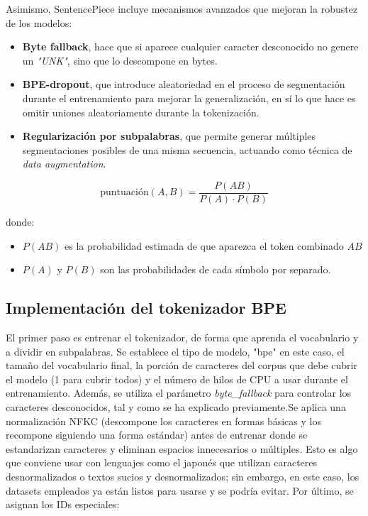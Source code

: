 \documentclass[11pt]{book}
\begin{document}
Asimismo, SentencePiece incluye mecanismos avanzados que mejoran la robustez de los modelos: 
\begin{itemize}
    \item \textbf{Byte fallback}, hace que si aparece cualquier caracter desconocido no genere un \textit{"UNK"}, sino que lo descompone en bytes.
    \item \textbf{BPE-dropout}, que introduce aleatoriedad en el proceso de segmentación durante el entrenamiento para mejorar la generalización, en sí lo que hace es omitir uniones aleatoriamente durante la tokenización.
    \item \textbf{Regularización por subpalabras}, que permite generar múltiples segmentaciones posibles de una misma secuencia, actuando como técnica de \textit{data augmentation}.
\end{itemize}


\[
\text{puntuación}(A,B) = \frac{P(AB)}{P(A) \cdot P(B)}
\]

donde:
\begin{itemize}
    \item $P(AB)$ es la probabilidad estimada de que aparezca el token combinado $AB$
    \item $P(A)$ y $P(B)$ son las probabilidades de cada símbolo por separado.
\end{itemize}
\text{\#\#\#\#\#\#\#\#\#\#\#\#\#\#\#\#\#\#\#\#\#\#\#\#\#\#\#\#\#\#\#\#\#}

\subsection{Implementación del tokenizador BPE}
El primer paso es entrenar el tokenizador, de forma que aprenda el vocabulario y a dividir en subpalabras. Se establece el tipo de modelo, "bpe" en este caso, el tamaño del vocabulario final, la porción de caracteres del corpus que debe cubrir el modelo (1 para cubrir todos) y el número de hilos de CPU a usar durante el entrenamiento. Además, se utiliza el parámetro \textit{byte\_fallback} para controlar los caracteres desconocidos, tal y como se ha explicado previamente.Se aplica una normalización NFKC (descompone los caracteres en formas básicas y los recompone siguiendo una forma estándar) antes de entrenar donde se estandarizan caracteres y eliminan espacios innecesarios o múltiples. Esto es algo que conviene usar con lenguajes como el japonés que utilizan caracteres desnormalizados o textos sucios y desnormalizados; sin embargo, en este caso, los datasets empleados ya están listos para usarse y se podría evitar. Por último, se asignan los IDs especiales:
\end{document}
